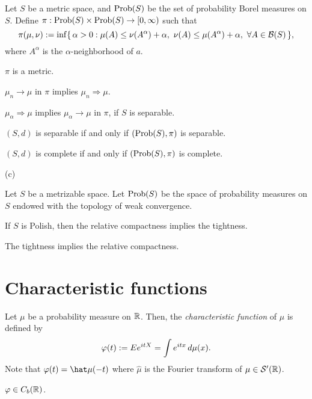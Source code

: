 \documentclass{../note}
\begin{document}
\begin{prb}
Let $S$ be a metric space, and $\operatorname{Prob}(S)$ be the set of probability Borel measures on $S$.
Define $\pi:\operatorname{Prob}(S)\times\operatorname{Prob}(S)\to[0,\infty)$ such that
\[\pi(\mu,\nu):=\inf\{\,\alpha>0:\mu(A)\le\nu(A^\alpha)+\alpha,\ \nu(A)\le\mu(A^\alpha)+\alpha,\ \forall A\in\cB(S)\,\},\]
where $A^\alpha$ is the $\alpha$-neighborhood of $a$.
\begin{parts}
\item $\pi$ is a metric.
\item $\mu_n\to\mu$ in $\pi$ implies $\mu_n\Rightarrow\mu$.
\item $\mu_\alpha\Rightarrow\mu$ implies $\mu_\alpha\to\mu$ in $\pi$, if $S$ is separable.
\item $(S,d)$ is separable if and only if $(\operatorname{Prob}(S),\pi)$ is separable.
\item $(S,d)$ is complete if and only if $(\operatorname{Prob}(S),\pi)$ is complete.
\end{parts}
\end{prb}
\begin{pf}
(c)
\end{pf}

\begin{prb}
Let $S$ be a metrizable space.
Let $\operatorname{Prob}(S)$ be the space of probability measures on $S$ endowed with the topology of weak convergence.
\begin{parts}
\item If $S$ is Polish, then the relative compactness implies the tightness.
\item The tightness implies the relative compactness.
\end{parts}
\end{prb}




\section{Characteristic functions}

\begin{prb}
Let $\mu$ be a probability measure on $\mathbb{R}$.
Then, the \emph{characteristic function} of $\mu$ is defined by
\[\varphi(t):=Ee^{itX}=\int e^{itx}\,d\mu(x).\]
Note that $\f(t)=\hat\mu(-t)$ where $\hat\mu$ is the Fourier transform of $\mu\in\mathcal{S}'(\mathbb{R})$.
\begin{parts}
\item $\varphi\in C_b(\mathbb{R})$.
\end{parts}
\end{prb}
\end{document}

